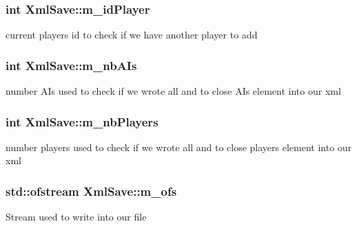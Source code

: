 \subsubsection[{m\+\_\+id\+Player}]{\setlength{\rightskip}{0pt plus 5cm}int Xml\+Save\+::m\+\_\+id\+Player\hspace{0.3cm}{\ttfamily [private]}}\label{class_xml_save_a35dfc6619f277f16c41b53125036da0e}
current player\textquotesingle{}s id to check if we have another player to add \hypertarget{class_xml_save_a1fa82deb2905a7882354ef5cb4e96efd}{}
\subsubsection[{m\+\_\+nb\+A\+Is}]{\setlength{\rightskip}{0pt plus 5cm}int Xml\+Save\+::m\+\_\+nb\+A\+Is\hspace{0.3cm}{\ttfamily [private]}}\label{class_xml_save_a1fa82deb2905a7882354ef5cb4e96efd}
number A\+Is used to check if we wrote all and to close A\+Is element into our xml \hypertarget{class_xml_save_a74aefcd3daf12a9bf12ea768459d66b3}{}
\subsubsection[{m\+\_\+nb\+Players}]{\setlength{\rightskip}{0pt plus 5cm}int Xml\+Save\+::m\+\_\+nb\+Players\hspace{0.3cm}{\ttfamily [private]}}\label{class_xml_save_a74aefcd3daf12a9bf12ea768459d66b3}
number players used to check if we wrote all and to close players element into our xml \hypertarget{class_xml_save_a06964370050c4b4791be4d283cf2e1d3}{}
\subsubsection[{m\+\_\+ofs}]{\setlength{\rightskip}{0pt plus 5cm}std\+::ofstream Xml\+Save\+::m\+\_\+ofs\hspace{0.3cm}{\ttfamily [private]}}\label{class_xml_save_a06964370050c4b4791be4d283cf2e1d3}
Stream used to write into our file \hypertarget{class_xml_save_a95ea43610318f8de62b9e056c26859c2}{}
